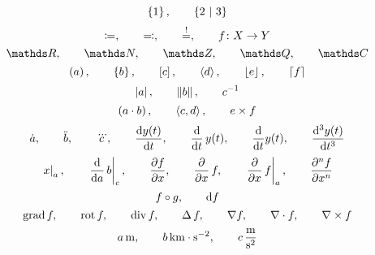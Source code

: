 \documentclass[a4paper,fleqn, 11pt]{article}
\begin{document}
  \[
    \set{1}{}
    \separate
    \set{2}{3}
  \]
  \[
    \coloneqq
    ,\qquad
    \eqqcolon
    ,\qquad
    \stackrel{!}{=}
    ,\qquad
    f\colon X\to Y
  \]
  \[
    \setReal
    \separate
    \setNatural
    \separate
    \setInteger
    \separate
    \setRational
    \separate
    \setComplex
  \]
  \[
    \left( a \right)
    ,\qquad
    \left\{ b \right\}
    ,\qquad
    \left[ c \right]
    ,\qquad
    \left\langle d \right\rangle
    ,\qquad
    \left\lfloor e \right\rfloor
    ,\qquad
    \left\lceil f \right\rceil
  \]
  \[
    \left| a \right|
    ,\qquad
    \left\| b \right\|
    ,\qquad
    {c}^{-1}
  \]
  \[
    \left( a\cdot b \right)
    ,\qquad
    \left\langle c,d \right\rangle
    ,\qquad
    e \times f
  \]
  \[
    \timeDerivative{a}
    \separate
    \timeSecondDerivative{b}
    \separate
    \timeThirdDerivative{c}
    \separate
    \leibnizDerivative{y(t)}{t}
    \separate
    \leibnizDerivativeOperator{t}{y(t)}
    \separate
    \leibnizDerivativeOperator{t}{}y(t)
    \separate
    \leibnizDerivative[3]{y(t)}{t}
  \]
  \[
    \appendValue{x}{a}
    \separate
    \leibnizDerivativeOperatorValue{a}{b}{c}
    \separate
    \leibnizPartialDerivative{f}{x}
    \separate
    \leibnizPartialDerivativeOperator{x}{f}
    \separate
    \leibnizPartialDerivativeOperatorValue{x}{f}{a}
    \separate
    \leibnizPartialDerivative[n]{f}{x}
  \]
  \[
    f\circ g
    ,\qquad
    \mathrm{d} f
  \]
  \[
      \operatorname{grad} f
      ,\qquad
      \operatorname{rot} f
      ,\qquad
      \operatorname{div} f
      ,\qquad
      \operatorname{\Delta} f
      ,\qquad
      \nabla f
      ,\qquad
      \nabla\cdot f
      ,\qquad
      \nabla\times f
  \]
  \[
    a\, \mathrm{m}
    ,\qquad
    b\, \mathrm{km\cdot s^{-2}}
    ,\qquad
    c\, \mathrm{\frac{m}{s^2}}
  \]
\end{document}
